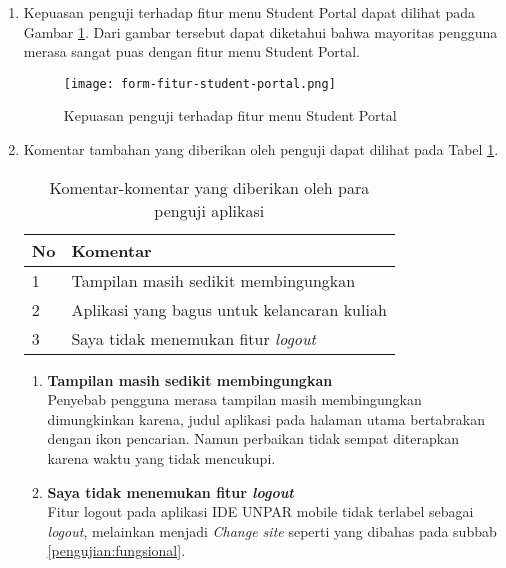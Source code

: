 \begin{enumerate}
\item Kepuasan penguji terhadap fitur menu Student Portal dapat dilihat pada Gambar \ref{responses:feature:stupor}. Dari gambar tersebut dapat diketahui bahwa mayoritas pengguna merasa sangat puas dengan fitur menu Student Portal.
\begin{figure}[H] 
	\centering  
	\texttt{[image: form-fitur-student-portal.png]}  
	\caption[Kepuasan penguji terhadap fitur menu Student Portal] {Kepuasan penguji terhadap fitur menu Student Portal} 
	\label{responses:feature:stupor} 
\end{figure}

\item Komentar tambahan yang diberikan oleh penguji dapat dilihat pada Tabel \ref{responses:comments}.

\begin{table}[ht]
\caption{Komentar-komentar yang diberikan oleh para penguji aplikasi}
\centering
\begin{tabular}{|l | l |}
\hline
\textbf{No} & \textbf{Komentar} \\  \hline
1 &  Tampilan masih sedikit membingungkan \\ \hline
2 & Aplikasi yang bagus untuk kelancaran kuliah \\ \hline
3 &  Saya tidak menemukan fitur \textit{logout} \\ 
\hline
\end{tabular}
\label{responses:comments}
\end{table}
	\begin{enumerate}
	\item \textbf{Tampilan masih sedikit membingungkan} \\
	Penyebab pengguna merasa tampilan masih membingungkan dimungkinkan karena, judul aplikasi pada halaman utama bertabrakan dengan ikon pencarian. Namun perbaikan tidak sempat diterapkan karena waktu yang tidak mencukupi.
	
	\item \textbf{Saya tidak menemukan fitur \textit{logout}} \\
	Fitur logout pada aplikasi IDE UNPAR mobile tidak terlabel sebagai \textit{logout}, melainkan menjadi \textit{Change site} seperti yang dibahas pada subbab \ref{pengujian:fungsional}.
	\end{enumerate}
\end{enumerate}



